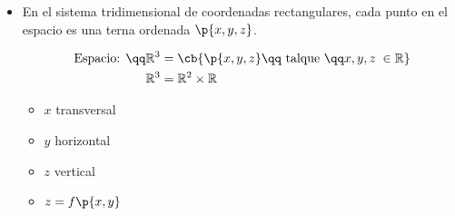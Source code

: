 \begin{itemize}
    \item En el sistema tridimensional de coordenadas rectangulares, cada punto en el espacio es una terna ordenada $\displaystyle \p{x,y,z} $.
        \begin{center}
           \begin{align*}
               \text{ Espacio:  } \qq \mathbb{R}^3 &= \cb{\p{x,y,z} \qq \text{ talque } \qq x,y,z \; \in \mathbb{R}} \\ 
               \mathbb{R}^3 &= \mathbb{R}^2 \times \mathbb{R} \\  
           \end{align*}
           \begin{itemize}
               \item $x$ transversal 
               \item $y$ horizontal 
               \item $z$ vertical 
               \item $\displaystyle z=f\p{x,y} $ 
           \end{itemize}
        \end{center}


\end{itemize}
